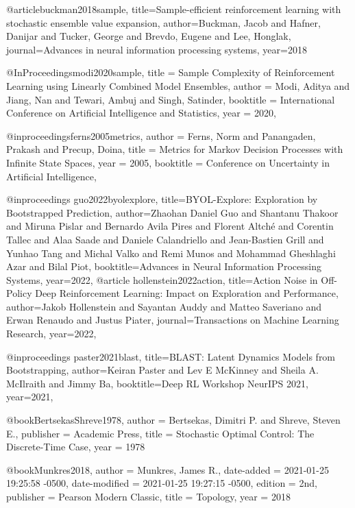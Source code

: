 @article{buckman2018sample,
  title={Sample-efficient reinforcement learning with stochastic ensemble value expansion},
  author={Buckman, Jacob and Hafner, Danijar and Tucker, George and Brevdo, Eugene and Lee, Honglak},
  journal={Advances in neural information processing systems},
  year={2018}
}


@InProceedings{modi2020sample,
  title = 	 {Sample Complexity of Reinforcement Learning using Linearly Combined Model Ensembles},
  author =       {Modi, Aditya and Jiang, Nan and Tewari, Ambuj and Singh, Satinder},
  booktitle = 	 {International Conference on Artificial Intelligence and Statistics},
  year = 	 {2020},
}

@inproceedings{ferns2005metrics,
author = {Ferns, Norm and Panangaden, Prakash and Precup, Doina},
title = {Metrics for Markov Decision Processes with Infinite State Spaces},
year = {2005},
booktitle = {Conference on Uncertainty in Artificial Intelligence},
}

@inproceedings{
guo2022byolexplore,
title={{BYOL}-Explore: Exploration by Bootstrapped Prediction},
author={Zhaohan Daniel Guo and Shantanu Thakoor and Miruna Pislar and Bernardo Avila Pires and Florent Altch{\'e} and Corentin Tallec and Alaa Saade and Daniele Calandriello and Jean-Bastien Grill and Yunhao Tang and Michal Valko and Remi Munos and Mohammad Gheshlaghi Azar and Bilal Piot},
booktitle={Advances in Neural Information Processing Systems},
year={2022},
}@article{
hollenstein2022action,
title={Action Noise in Off-Policy Deep Reinforcement Learning: Impact on Exploration and Performance},
author={Jakob Hollenstein and Sayantan Auddy and Matteo Saveriano and Erwan Renaudo and Justus Piater},
journal={Transactions on Machine Learning Research},
year={2022},
}

@inproceedings{
paster2021blast,
title={{BLAST}: Latent Dynamics Models from Bootstrapping},
author={Keiran Paster and Lev E McKinney and Sheila A. McIlraith and Jimmy Ba},
booktitle={Deep RL Workshop NeurIPS 2021},
year={2021},
}


@book{BertsekasShreve1978,
	author = {Bertsekas, Dimitri P. and Shreve, Steven E.},
	publisher = {Academic Press},
	title = {Stochastic Optimal Control: The Discrete-Time Case},
	year = {1978}}


@book{Munkres2018,
	author = {Munkres, James R.},
	date-added = {2021-01-25 19:25:58 -0500},
	date-modified = {2021-01-25 19:27:15 -0500},
	edition = {2nd},
	publisher = {Pearson Modern Classic},
	title = {Topology},
	year = {2018}}

